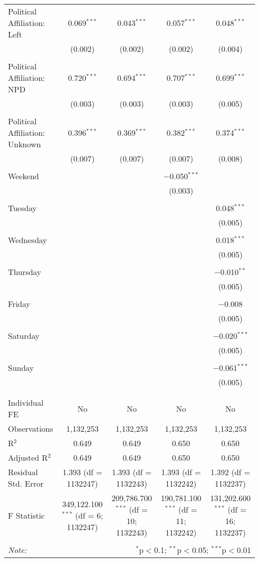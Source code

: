 \documentclass[
]{article}
\begin{document}
\begin{table}[!htbp]
{\begin{tabular}{@{\extracolsep{5pt}}lcccc}
 Political Affiliation: Left & 0.069$^{***}$ & 0.043$^{***}$ & 0.057$^{***}$ & 0.048$^{***}$ \\ 
  & (0.002) & (0.002) & (0.002) & (0.004) \\ 
  & & & & \\ 
 Political Affiliation: NPD & 0.720$^{***}$ & 0.694$^{***}$ & 0.707$^{***}$ & 0.699$^{***}$ \\ 
  & (0.003) & (0.003) & (0.003) & (0.005) \\ 
  & & & & \\ 
 Political Affiliation: Unknown & 0.396$^{***}$ & 0.369$^{***}$ & 0.382$^{***}$ & 0.374$^{***}$ \\ 
  & (0.007) & (0.007) & (0.007) & (0.008) \\ 
  & & & & \\ 
 Weekend &  &  & $-$0.050$^{***}$ &  \\ 
  &  &  & (0.003) &  \\ 
  & & & & \\ 
 Tuesday &  &  &  & 0.048$^{***}$ \\ 
  &  &  &  & (0.005) \\ 
  & & & & \\ 
 Wednesday &  &  &  & 0.018$^{***}$ \\ 
  &  &  &  & (0.005) \\ 
  & & & & \\ 
 Thursday &  &  &  & $-$0.010$^{**}$ \\ 
  &  &  &  & (0.005) \\ 
  & & & & \\ 
 Friday &  &  &  & $-$0.008 \\ 
  &  &  &  & (0.005) \\ 
  & & & & \\ 
 Saturday &  &  &  & $-$0.020$^{***}$ \\ 
  &  &  &  & (0.005) \\ 
  & & & & \\ 
 Sunday &  &  &  & $-$0.061$^{***}$ \\ 
  &  &  &  & (0.005) \\ 
  & & & & \\ 
\hline \\[-1.8ex] 
Individual FE & No & No & No & No \\ 
Observations & 1,132,253 & 1,132,253 & 1,132,253 & 1,132,253 \\ 
R$^{2}$ & 0.649 & 0.649 & 0.650 & 0.650 \\ 
Adjusted R$^{2}$ & 0.649 & 0.649 & 0.650 & 0.650 \\ 
Residual Std. Error & 1.393 (df = 1132247) & 1.393 (df = 1132243) & 1.393 (df = 1132242) & 1.392 (df = 1132237) \\ 
F Statistic & 349,122.100$^{***}$ (df = 6; 1132247) & 209,786.700$^{***}$ (df = 10; 1132243) & 190,781.100$^{***}$ (df = 11; 1132242) & 131,202.600$^{***}$ (df = 16; 1132237) \\ 
\hline 
\hline \\[-1.8ex] 
\textit{Note:}  & \multicolumn{4}{r}{$^{*}$p$<$0.1; $^{**}$p$<$0.05; $^{***}$p$<$0.01} \\ 
\end{tabular}
} 
\end{table} 
\newpage
\end{document}
